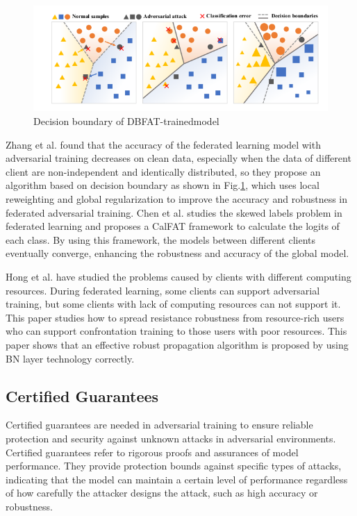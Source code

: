 \documentclass[conference]{IEEEtran}
\begin{document}
\begin{figure}[htbp]
    \centerline{\includegraphics[width=1.0\linewidth,height=0.4\linewidth]{picture/db.png}}
    \caption{Decision boundary of DBFAT-trainedmodel}
    \label{fig19}
\end{figure}

Zhang et al.\cite{b34} found that the accuracy of the federated learning model with
adversarial training decreases on clean data, especially when the data of different
client are non-independent and identically distributed, so they propose an algorithm
based on decision boundary as shown in Fig.\ref{fig19}, which uses local reweighting and global regularization
to improve the accuracy and robustness in federated adversarial training.
Chen et al.\cite{b32} studies the skewed labels problem in federated learning and proposes
a CalFAT framework to calculate the logits of each class. By using this framework, the models between different clients eventually converge, 
enhancing the robustness and accuracy of the global model.

Hong et al.\cite{b105} have studied the problems caused by clients with different computing resources.
During federated learning, some clients can support adversarial training, but some clients with
lack of computing resources can not support it. This paper studies how to spread resistance robustness
from resource-rich users who can support confrontation training to those users with poor resources.
This paper shows that an effective robust propagation algorithm is proposed by using BN layer technology correctly.  

\subsection{Certified Guarantees}  
Certified guarantees are needed in adversarial training to ensure reliable protection and security against unknown attacks in adversarial environments.
Certified guarantees refer to rigorous proofs and assurances of model performance. 
They provide protection bounds against specific types of attacks, 
indicating that the model can maintain a certain level of performance regardless of how carefully the attacker designs the attack, such as high accuracy or robustness.
\end{document}
